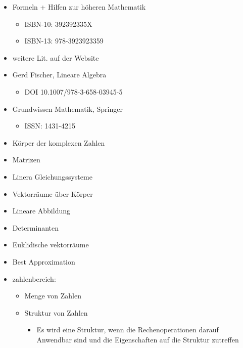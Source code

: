 \documentclass{../tudscript}
\begin{document}
\begin{itemize}
\tightlist
\item
  Formeln + Hilfen zur höheren Mathematik

  \begin{itemize}
  \tightlist
  \item
    ISBN-10: 392392335X
  \item
    ISBN-13: 978-3923923359
  \end{itemize}
\item
  weitere Lit. auf der Website
\item
  Gerd Fischer, Lineare Algebra

  \begin{itemize}
  \tightlist
  \item
    DOI 10.1007/978-3-658-03945-5
  \end{itemize}
\item
  Grundwissen Mathematik, Springer

  \begin{itemize}
  \tightlist
  \item
    ISSN: 1431-4215
  \end{itemize}
\end{itemize}

\hypertarget{inhalt-der-vl}{%
\label{inhalt-der-vl}}

\begin{itemize}
\tightlist
\item
  Körper der komplexen Zahlen
\item
  Matrizen
\item
  Linera Gleichungssysteme
\item
  Vektorräume über Körper
\item
  Lineare Abbildung
\item
  Determinanten
\item
  Euklidische vektorräume
\item
  Best Approximation
\end{itemize}

\hypertarget{vl-einfuxfchrung-kuxf6rper-der-komplexen-zahlen}{%
\label{vl-einfuxfchrung-kuxf6rper-der-komplexen-zahlen}}

\begin{itemize}
\tightlist
\item
  zahlenbereich:

  \begin{itemize}
  \tightlist
  \item
    Menge von Zahlen
  \item
    Struktur von Zahlen

    \begin{itemize}
    \tightlist
    \item
      Es wird eine Struktur, wenn die Rechenoperationen darauf Anwendbar
      sind und die Eigenschaften auf die Struktur zutreffen
    \end{itemize}
  \end{itemize}
\end{itemize}
\end{document}
